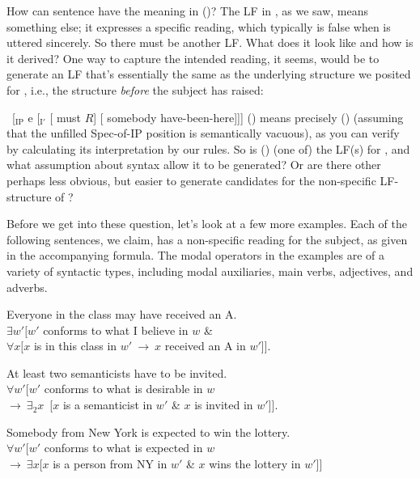 How can sentence  have the meaning in (\lastx)? The LF in
, as we saw, means something else; it expresses a specific reading,
which typically is false when  is uttered sincerely. So there must be
another LF. What does it look like and how is it derived? One way to capture the
intended reading, it seems, would be to generate an LF that's essentially the
same as the underlying structure we posited for , i.e., the structure
\emph{before} the subject has raised:

\ex\ [$_{\text{IP}}$ e [$_{\text{I}'}$ [ must $R$] [ somebody have-been-here]]] \xe
%
(\lastx) means precisely (\blastx) (assuming that the unfilled Spec-of-IP
position is semantically vacuous), as you can verify by calculating its
interpretation by our rules. So is (\lastx) (one of) the LF(s) for ,
and what assumption about syntax allow it to be generated? Or are there other
\dash perhaps less obvious, but easier to generate \dash candidates for the
non-specific LF-structure of ?

Before we get into these question, let's look at a few more examples. Each of
the following sentences, we claim, has a non-specific reading for the subject,
as given in the accompanying formula. The modal operators in the examples are of
a variety of syntactic types, including modal auxiliaries, main verbs,
adjectives, and adverbs.

\ex\label{everymay} Everyone in the class may have received an A.\\
$\exists w'[w'$ conforms to what I believe in $w$ \&\\
\null\hfill$\forall x[x$ is in this class in $w'\ \rightarrow\ x$ received an A in $w'$]].\xe

\ex At least two semanticists have to be invited.\\
$\forall w'[w'$ conforms to what is desirable in $w$\\
\null\hfill$ \rightarrow\ \exists_2 x$\ [$x$ is a semanticist in $w'$ \& $x$ is invited in $w'$]].\xe

\ex\label{ny} Somebody from New York is expected to win the lottery.\\
$\forall w'[w'$ conforms to what is expected in $w$\\
\null\hfill$ \rightarrow\ \exists x[x$ is a person from NY in $w'$ \& $x$ wins the lottery in $w'$]]\xe

